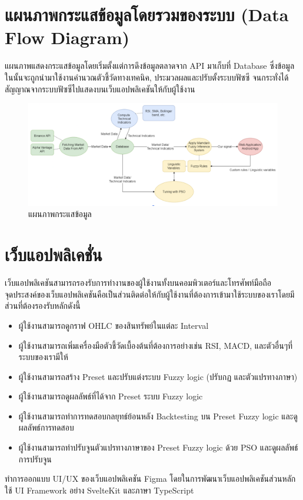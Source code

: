 \section{แผนภาพกระแสข้อมูลโดยรวมของระบบ (Data Flow Diagram)}
แผนภาพแสดงกระแสข้อมูลโดยเริ่มตั้งแต่การดึงข้อมูลตลาดจาก API มาเก็บที่ Database ซึ่งข้อมูลในนั้นจะถูกนำมาใช้งานคำนวณตัวชี้วัดทางเทคนิค, ประมวลผลและปรับตั้งระบบฟัซซี จนกระทั่งได้สัญญาณจากระบบฟัซซีไปแสดงบนเว็บแอปพลิเคชันให้กับผู้ใช้งาน
\begin{figure}[ht]
    \centering
    \includegraphics[scale=0.3]{images/overview.png}
    \caption{แผนภาพกระแสข้อมูล}
    \label{fig:11}
\end{figure}

\section{เว็บแอปพลิเคชั่น}
เว็บแอปพลิเคชันสามารถรองรับการทำงานของผู้ใช้งานทั้งบนคอมพิวเตอร์และโทรศัพท์มือถือ \\
จุดประสงค์ของเว็บแอปพลิเคชันคือเป็นส่วนติดต่อให้กับผู้ใช้งานที่ต้องการเข้ามาใช้ระบบของเราโดยมีส่วนที่ต้องรองรับหลักดังนี้
\begin{itemize}
    \item ผู้ใช้งานสามารถดูกราฟ OHLC ของสินทรัพย์ในแต่ละ Interval
    \item ผู้ใช้งานสามารถเพิ่มเครื่องมือตัวชี้วัดเบื้องต้นที่ต้องการอย่างเช่น RSI, MACD, และตัวอื่นๆที่ระบบของเรามีให้
    \item ผู้ใช้งานสามารถสร้าง Preset และปรับแต่งระบบ Fuzzy logic (ปรับกฏ และตัวแปรทางภาษา)
    \item ผู้ใช้งานสามารถดูผลลัพธ์ที่ได้จาก Preset ระบบ Fuzzy logic
    \item ผู้ใช้งานสามารถทำการทดสอบกลยุทธ์ย้อนหลัง Backtesting บน Preset Fuzzy logic และดูผลลัพธ์การทดสอบ
    \item ผู้ใช้งานสามารถทำปรับจูนตัวแปรทางภาษาของ Preset Fuzzy logic ด้วย PSO และดูผลลัพธ์การปรับจูน
\end{itemize}
ทำการออกแบบ UI/UX ของเว็บแอปพลิเคชัน Figma
โดยในการพัฒนาเว็บแอปพลิเคชันส่วนหลักใช้ UI Framework อย่าง SvelteKit และภาษา TypeScript


